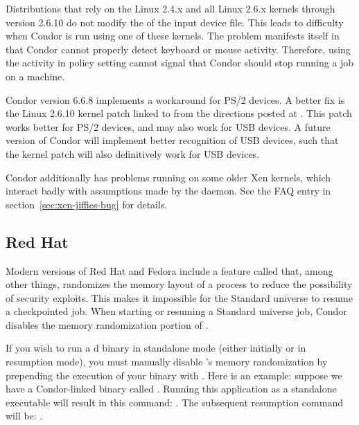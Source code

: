 Distributions that rely on the Linux 2.4.x and all Linux 2.6.x kernels
through version 2.6.10
do not modify the  of the input device file.
This leads to difficulty when Condor is run using one of these
kernels. 
The problem manifests itself in that Condor cannot properly
detect keyboard or mouse activity.
Therefore, using the activity in policy setting cannot
signal that Condor should stop running a job on a machine.

Condor version 6.6.8 implements a workaround for PS/2 devices.
A better fix is the Linux 2.6.10 kernel
patch linked to from the directions posted at
.
This patch works better for PS/2 devices, and
may also work for USB devices.
A future version of Condor will implement better recognition
of USB devices,
such that the kernel patch will also definitively work for USB devices.

Condor additionally has problems running on some older Xen kernels,
which interact badly with assumptions made by the 
daemon. See the FAQ entry in section~\ref{sec:xen-jiffies-bug} for
details.

\subsection{\label{sec:platform-linux-redhat}Red Hat}

Modern versions of Red Hat and Fedora include a feature called
 that, among other things, randomizes the memory
layout of a process
to reduce the possibility of security exploits. This makes it impossible
for the Standard universe to resume a checkpointed job. When starting
or resuming a Standard universe job, Condor disables the memory
randomization portion of .

If you wish to run a d binary in standalone mode
(either initially or in resumption mode), you must manually disable
's memory randomization by prepending the execution
of your binary with .
Here is an example: suppose we have a
Condor-linked binary called . Running this application as a
standalone executable will result in this command: . The subsequent resumption command will be: 
.
